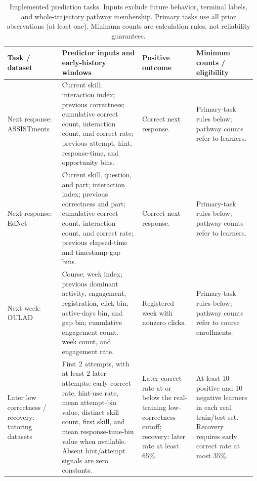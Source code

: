 \begin{table}[!htbp]
\centering
\caption{Implemented prediction tasks. Inputs exclude future behavior, terminal labels, and whole-trajectory pathway membership. Primary tasks use all prior observations (at least one). Minimum counts are calculation rules, not reliability guarantees.}
\label{tab:prediction-specification}
\footnotesize
\setlength{\tabcolsep}{3pt}
\begin{tabularx}{\linewidth}{@{}>{\raggedright\arraybackslash}p{2.15cm}>{\raggedright\arraybackslash}X>{\raggedright\arraybackslash}p{2.85cm}>{\raggedright\arraybackslash}p{3.8cm}@{}}
\toprule
Task / dataset & Predictor inputs and early-history windows & Positive outcome & Minimum counts / eligibility \\
\midrule
Next response: ASSISTments & Current skill; interaction index; previous correctness; cumulative correct count, interaction count, and correct rate; previous attempt, hint, response-time, and opportunity bins. & Correct next response. & Primary-task rules below; pathway counts refer to learners. \\
\addlinespace
Next response: EdNet & Current skill, question, and part; interaction index; previous correctness and part; cumulative correct count, interaction count, and correct rate; previous elapsed-time and timestamp-gap bins. & Correct next response. & Primary-task rules below; pathway counts refer to learners. \\
\addlinespace
Next week: OULAD & Course; week index; previous dominant activity, engagement, registration, click bin, active-days bin, and gap bin; cumulative engagement count, week count, and engagement rate. & Registered week with nonzero clicks. & Primary-task rules below; pathway counts refer to course enrollments. \\
\addlinespace
Later low correctness / recovery: tutoring datasets & First 2 attempts, with at least 2 later attempts: early correct rate, hint-use rate, mean attempt-bin value, distinct skill count, first skill, and mean response-time-bin value when available. Absent hint/attempt signals are zero constants. & Later correct rate at or below the real-training low-correctness cutoff; recovery: later rate at least 65\%. & At least 10 positive and 10 negative learners in each real train/test set. Recovery requires early correct rate at most 35\%. \\

\end{tabularx}
\end{table}
